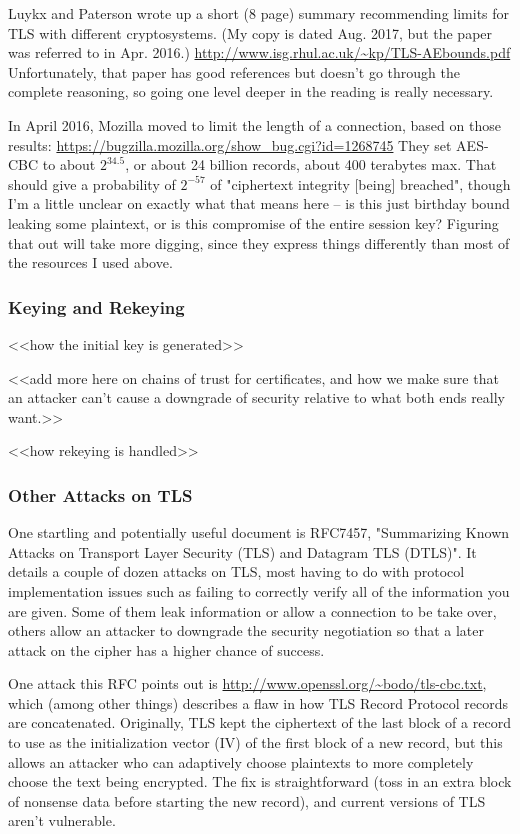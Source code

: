 \documentclass[%
 aip,
 jmp,%
 amsmath,amssymb,
 reprint,%
]{revtex4-1}
\begin{document}
Luykx and Paterson wrote up a short (8 page) summary recommending
limits for TLS with different cryptosystems. (My copy is dated
Aug. 2017, but the paper was referred to in Apr. 2016.)
\url{http://www.isg.rhul.ac.uk/~kp/TLS-AEbounds.pdf}
Unfortunately, that paper has good references but doesn't go through
the complete reasoning, so going one level deeper in the reading is
really necessary.

In April 2016, Mozilla moved to limit the length of a connection,
based on those results:
\url{https://bugzilla.mozilla.org/show_bug.cgi?id=1268745}
They set AES-CBC to about $2^{34.5}$, or about 24 billion records, about
400 terabytes max.  That should give a probability of $2^{-57}$ of
"ciphertext integrity [being] breached", though I'm a little unclear
on exactly what that means here -- is this just birthday bound leaking
some plaintext, or is this compromise of the entire session key?
Figuring that out will take more digging, since they express things
differently than most of the resources I used above.

\subsubsection{Keying and Rekeying}

<<how the initial key is generated>>

<<add more here on chains of trust for certificates, and how we make
sure that an attacker can't cause a downgrade of security relative to
what both ends really want.>>

<<how rekeying is handled>>

\subsubsection{Other Attacks on TLS}

One startling and potentially useful document is RFC7457, "Summarizing
Known Attacks on Transport Layer Security (TLS) and Datagram TLS
(DTLS)".  It details a couple of dozen attacks on TLS, most having to do
with protocol implementation issues such as failing to correctly
verify all of the information you are given.  Some of them leak
information or allow a connection to be take over, others allow an
attacker to downgrade the security negotiation so that a later attack
on the cipher has a higher chance of success.

One attack this RFC points out is
\url{http://www.openssl.org/~bodo/tls-cbc.txt}, which (among other things)
describes a flaw in how TLS Record Protocol records are concatenated.
Originally, TLS kept the ciphertext of the last block of a record to
use as the initialization vector (IV) of the first block of a new
record, but this allows an attacker who can adaptively choose
plaintexts to more completely choose the text being encrypted.  The
fix is straightforward (toss in an extra block of nonsense data before
starting the new record), and current versions of TLS aren't
vulnerable.
\end{document}

